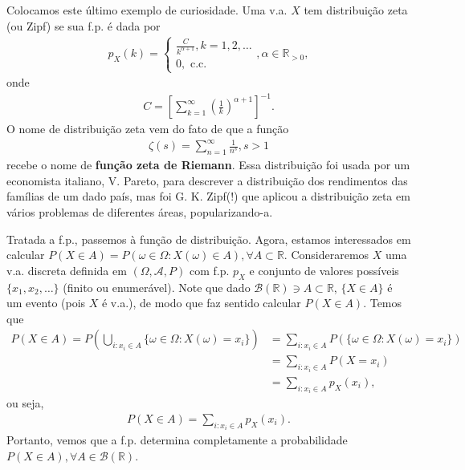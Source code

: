 \documentclass[../Notas.tex]{subfiles}
\begin{document}
\begin{example}
Colocamos este último exemplo de curiosidade. Uma v.a. $X$ tem distribuição zeta (ou Zipf) se sua f.p. é dada por
\begin{align*}
    p_X(k) = \begin{cases}
    \frac{C}{k^{\alpha + 1}}, k = 1, 2, \dots \\
    0, \text{ c.c.}
    \end{cases}, \alpha\in\mathbb{R}_{>0},
\end{align*}
onde
\begin{align*}
    C = \left[ \sum_{k=1}^{\infty}\left(\frac{1}{k}\right)^{\alpha + 1} \right]^{-1}.
\end{align*}
O nome de distribuição zeta vem do fato de que a função
\begin{align*}
    \zeta(s) = \sum_{n=1}^{\infty}\frac{1}{n^s}, s>1
\end{align*}
recebe o nome de \textbf{função zeta de Riemann}. Essa distribuição foi usada por um economista italiano, V. Pareto, para descrever a distribuição dos rendimentos das famílias de um dado país, mas foi G. K. Zipf(!) que aplicou a distribuição zeta em vários problemas de diferentes áreas, popularizando-a.
\end{example}

Tratada a f.p., passemos à função de distribuição. Agora, estamos interessados em calcular $P(X\in A) = P(\omega\in\Omega : X(\omega)\in A), \forall A\subset\mathbb{R}$. Consideraremos $X$ uma v.a. discreta definida em $(\Omega, \mathcal{A}, P)$ com f.p. $p_X$ e conjunto de valores possíveis $\{ x_1, x_2, \dots \}$ (finito ou enumerável). Note que dado $\mathcal{B}(\mathbb{R}) \ni A\subset\mathbb{R}$, $\{X\in A\}$ é um evento (pois $X$ é v.a.), de modo que faz sentido calcular $P(X\in A)$. Temos que
\begin{align*}
    P(X\in A) = P\left( \bigcup_{i : x_i\in A}\{ \omega\in\Omega : X(\omega) = x_i \} \right) &= \sum_{i : x_i\in A}P\left( \{ \omega\in\Omega : X(\omega) = x_i \} \right) \\
    &= \sum_{i : x_i\in A}P(X=x_i) \\
    &= \sum_{i : x_i\in A}p_X(x_i),
\end{align*}
ou seja,
\begin{align*}
    P(X\in A) = \sum_{i : x_i\in A} p_X(x_i).
\end{align*}
Portanto, vemos que a f.p. determina completamente a probabilidade $P(X\in A), \forall A\in\mathcal{B}(\mathbb{R})$.
\end{document}
